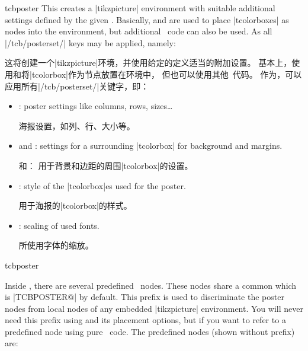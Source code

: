 \begin{docEnvironment}[doc new=2017-07-03]{tcbposter}{}
This creates a |tikzpicture| environment with suitable additional
settings defined by the given .
Basically,  and  are
used to place |tcolorboxes| as nodes into the environment,
but additional \tikzname\ code can also be used.
As  all |/tcb/posterset/| keys may be applied, namely:

这将创建一个|tikzpicture|环境，并使用给定的定义适当的附加设置。
基本上，使用和将|tcolorbox|作为节点放置在环境中，
但也可以使用其他\tikzname\ 代码。
作为，可以应用所有|/tcb/posterset/|关键字，即：
\begin{itemize}
\item{}: poster settings like columns, rows, sizes\ldots

海报设置，如列、行、大小等。
\item{} and :
  settings for a surrounding |tcolorbox| for background and margins.

和：
用于背景和边距的周围|tcolorbox|的设置。
\item{}: style of the |tcolorbox|es used for the poster.

用于海报的|tcolorbox|的样式。
\item{}: scaling of used fonts.

所使用字体的缩放。
\end{itemize}

\begin{exdispExample}{tcbposter}
  \begin{tcbposter}[
    poster = {showframe,height=10cm,spacing=2mm},
    boxes  = {beamer,colframe=blue!50!black,colback=blue!50,colupper=yellow!50},
  ]
  \end{tcbposter}
\end{exdispExample}
\end{docEnvironment}

%
Inside , there are several predefined \tikzname\ nodes.
These nodes share a common  which is
|TCBPOSTER@| by default. This prefix is used to discriminate the
poster nodes from local nodes of any embedded |tikzpicture| environment.
You will never need this prefix using  and its
placement options, but if you want to refer to a predefined node using
pure \tikzname\ code.
The predefined nodes (shown without prefix) are:
  
